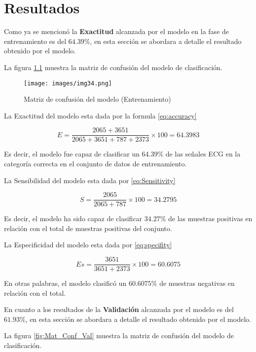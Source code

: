 \chapter{Resultados}
\label{chap:results}
Como ya se mencionó la \textbf{Exactitud} alcanzada por el modelo en la fase de entrenamiento es del $64.39\%$, en esta sección se abordara a detalle el resultado obtenido por el modelo.

La figura \ref{fig:Mat_Conf} muestra la matriz de confusión del modelo de clasificación.

\begin{figure}[!ht]
    \centering
    \texttt{[image: images/img34.png]}
    \caption{Matriz de confusión del modelo (Entrenamiento)}
    \label{fig:Mat_Conf}
\end{figure}

La Exactitud del modelo esta dada por la formula \ref{eq:accuracy}

\begin{equation}
    E = \frac{2065 + 3651}{2065 + 3651 + 787 + 2373} \times 100 = 64.3983
\end{equation}

Es decir, el modelo fue capaz de clasificar un 64.39\% de las señales ECG en la categoría correcta en el conjunto de datos de entrenamiento.

La Sensibilidad del modelo esta dada por \ref{eq:Sensitivity}

\begin{equation}
    S = \frac{2065}{2065 + 787} \times 100 = 34.2795
\end{equation}

Es decir, el modelo ha sido capaz de clasificar $34.27\%$ de las muestras positivas en relación con el total de muestras positivas del conjunto.

La Especificidad del modelo esta dada por \ref{eq:specifity}

\begin{equation}
    Es = \frac{3651}{3651 + 2373} \times 100 = 60.6075
\end{equation}

En otras palabras, el modelo clasificó un $60.6075\%$ de muestras negativas en relación con el total.


En cuanto a los resultados de la \textbf{Validación} alcanzada por el modelo es del $61.93\%$, en esta sección se abordara a detalle el resultado obtenido por el modelo.

La figura \ref{fig:Mat_Conf_Val} muestra la matriz de confusión del modelo de clasificación.

